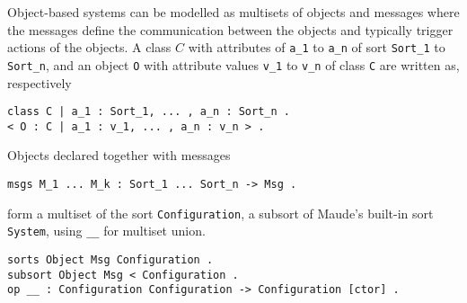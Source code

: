 Object-based systems can be modelled as multisets of objects and
messages where the messages define the communication between the
objects and typically trigger actions of the objects. A class $C$ with
attributes of \verb|a_1| to \verb|a_n| of sort \verb|Sort_1| to \verb|Sort_n|, and an object {\tt O}
with attribute values \verb|v_1| to \verb|v_n| of class {\tt C} are written as, respectively
%
\begin{lstlisting}[columns=fixed]
class C | a_1 : Sort_1, ... , a_n : Sort_n .  
< O : C | a_1 : v_1, ... , a_n : v_n > .
\end{lstlisting}
%
Objects declared together with messages
\begin{lstlisting}[columns=fixed]
msgs M_1 ... M_k : Sort_1 ... Sort_n -> Msg .  
\end{lstlisting}
form a multiset of the sort \texttt{Configuration}, a subsort of Maude's built-in sort
\texttt{System},  using \verb|__| for multiset union.
\begin{lstlisting}[columns=fixed]
sorts Object Msg Configuration .
subsort Object Msg < Configuration . 
op __ : Configuration Configuration -> Configuration [ctor] .
\end{lstlisting}

